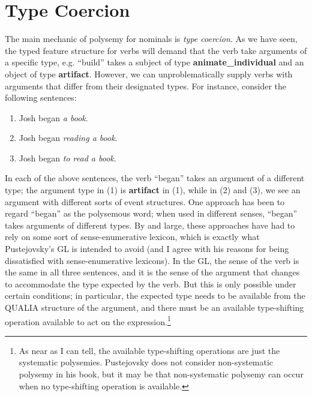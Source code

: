 \documentclass[12pt]{amsart}
\begin{document}
\section{Type Coercion}

The main mechanic of polysemy for nominals is \emph{type coercion}. As we have seen, the typed feature structure for verbs will demand that the verb take arguments of a specific type, e.g. ``build'' takes a subject of type {\bf animate\_individual} and an object of type {\bf artifact}. However, we can unproblematically supply verbs with arguments that differ from their designated types. For instance, consider the following sentences:
\begin{enumerate}
\item Josh began \emph{a book}.
\item Josh began \emph{reading a book}.
\item Josh began \emph{to read a book}.
\end{enumerate}
In each of the above sentences, the verb ``began'' takes an argument of a different type; the argument type in (1) is {\bf artifact} in (1), while in (2) and (3), we see an argument with different sorts of event structures. One approach has been to regard ``began'' as the polysemous word; when used in different senses, ``began'' takes arguments of different types. By and large, these approaches have had to rely on some sort of sense-enumerative lexicon, which is exactly what Pustejovsky's GL is intended to avoid (and I agree with his reasons for being dissatisfied with sense-enumerative lexicons). In the GL, the sense of the verb is the same in all three sentences, and it is the sense of the argument that changes to accommodate the type expected by the verb. But this is only possible under certain conditions; in particular, the expected type needs to be available from the QUALIA structure of the argument, and there must be an available type-shifting operation available to act on the expression.\footnote{As near as I can tell, the available type-shifting operations are just the systematic polysemies. Pustejovsky does not consider non-systematic polysemy in his book, but it may be that non-systematic polysemy can occur when no type-shifting operation is available.}
\end{document}
